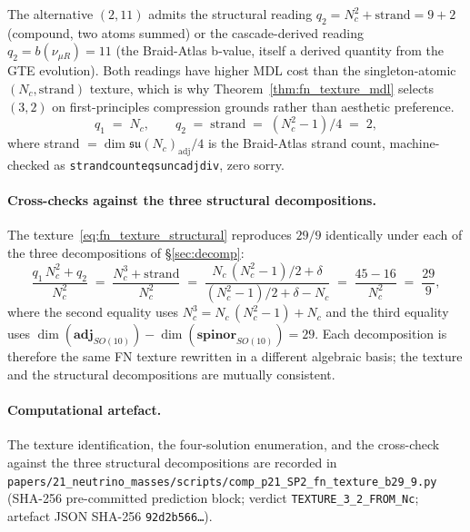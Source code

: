 \documentclass[12pt,a4paper]{article}
\theoremstyle{definition}
\theoremstyle{remark}
\newcommand{\lean}[1]{%
  \penalty-100
  \begingroup\def\_{\textunderscore\allowbreak}\texttt{#1}\endgroup}
\begin{document}
The alternative $(2, 11)$ admits the structural reading
$q_2 = N_c^2 + \mathrm{strand} = 9 + 2$ (compound, two atoms summed) or the
cascade-derived reading $q_2 = b(\nu_{\mu R}) = 11$ (the Braid-Atlas
b-value, itself a derived quantity from the GTE evolution).  Both readings
have higher MDL cost than the singleton-atomic $(N_c, \mathrm{strand})$
texture, which is why Theorem~\ref{thm:fn_texture_mdl} selects $(3, 2)$ on
first-principles compression grounds rather than aesthetic preference.
\begin{equation}
  q_1 \;=\; N_c, \qquad q_2 \;=\; \mathrm{strand} \;=\; (N_c^2-1)/4 \;=\; 2,
  \label{eq:fn_texture_structural}
\end{equation}
where strand $= \dim\mathfrak{su}(N_c)_{\mathrm{adj}}/4$ is the Braid-Atlas
strand count, machine-checked as
\lean{strand\_count\_eq\_su\_nc\_adj\_div\_4}, zero sorry.

\paragraph{Cross-checks against the three structural decompositions.}
The texture~\eqref{eq:fn_texture_structural} reproduces $29/9$ identically
under each of the three decompositions of \S\ref{sec:decomp}:
\begin{equation}
\frac{q_1\,N_c^2 + q_2}{N_c^2}
\;=\;
\frac{N_c^3 + \mathrm{strand}}{N_c^2}
\;=\;
\frac{N_c\,(N_c^2 - 1)/2 + \delta}{(N_c^2-1)/2 + \delta - N_c}
\;=\;
\frac{45 - 16}{N_c^2}
\;=\;
\frac{29}{9},
\end{equation}
where the second equality uses
$N_c^3 = N_c\,(N_c^2-1) + N_c$ and the third equality uses
$\dim(\mathbf{adj}_{SO(10)}) - \dim(\mathbf{spinor}_{SO(10)}) = 29$.
Each decomposition is therefore the same FN texture rewritten in a different
algebraic basis; the texture and the structural decompositions are mutually
consistent.

\paragraph{Computational artefact.}
The texture identification, the four-solution enumeration, and the
cross-check against the three structural decompositions are recorded in
\nolinkurl{papers/21_neutrino_masses/scripts/comp_p21_SP2_fn_texture_b29_9.py}
(SHA-256 pre-committed prediction block;
verdict \texttt{TEXTURE\_3\_2\_FROM\_Nc};
artefact JSON SHA-256 \texttt{92d2b566\ldots}).
\end{document}
